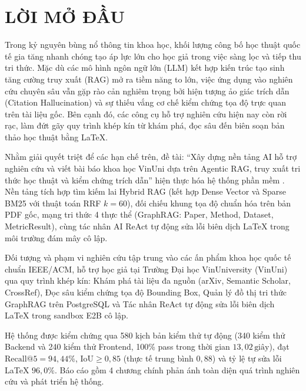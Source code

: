 \cleardoublepage
{}
\chapter*{LỜI MỞ ĐẦU}

Trong kỷ nguyên bùng nổ thông tin khoa học, khối lượng công bố học thuật quốc tế gia tăng nhanh chóng tạo áp lực lớn cho học giả trong việc sàng lọc và tiếp thu tri thức. Mặc dù các mô hình ngôn ngữ lớn (LLM) kết hợp kiến trúc tạo sinh tăng cường truy xuất (RAG) mở ra tiềm năng to lớn, việc ứng dụng vào nghiên cứu chuyên sâu vẫn gặp rào cản nghiêm trọng bởi hiện tượng ảo giác trích dẫn (Citation Hallucination) và sự thiếu vắng cơ chế kiểm chứng tọa độ trực quan trên tài liệu gốc. Bên cạnh đó, các công cụ hỗ trợ nghiên cứu hiện nay còn rời rạc, làm đứt gãy quy trình khép kín từ khám phá, đọc sâu đến biên soạn bản thảo học thuật bằng LaTeX.

Nhằm giải quyết triệt để các hạn chế trên, đề tài: ``Xây dựng nền tảng AI hỗ trợ nghiên cứu và viết bài báo khoa học VinUni dựa trên Agentic RAG, truy xuất tri thức học thuật và kiểm chứng trích dẫn'' hiện thực hóa hệ thống phần mềm \VS. Nền tảng tích hợp tìm kiếm lai Hybrid RAG (kết hợp Dense Vector và Sparse BM25 với thuật toán RRF $k=60$), đối chiếu khung tọa độ chuẩn hóa trên bản PDF gốc, mạng tri thức 4 thực thể (GraphRAG: Paper, Method, Dataset, MetricResult), cùng tác nhân AI ReAct tự động sửa lỗi biên dịch LaTeX trong môi trường đám mây cô lập.

Đối tượng và phạm vi nghiên cứu tập trung vào các ấn phẩm khoa học quốc tế chuẩn IEEE/ACM, hỗ trợ học giả tại Trường Đại học VinUniversity (VinUni) qua quy trình khép kín: Khám phá tài liệu đa nguồn (arXiv, Semantic Scholar, CrossRef), Đọc sâu kiểm chứng tọa độ Bounding Box, Quản lý đồ thị tri thức GraphRAG trên PostgreSQL và Tác nhân ReAct tự động sửa lỗi biên dịch LaTeX trong sandbox E2B cô lập.

Hệ thống được kiểm chứng qua 580 kịch bản kiểm thử tự động (340 kiểm thử Backend và 240 kiểm thử Frontend, 100\% pass trong thời gian $13{,}02\,\text{giây}$), đạt $\text{Recall@5} = 94{,}44\%$, $\text{IoU} \ge 0{,}85$ (thực tế trung bình $0{,}88$) và tỷ lệ tự sửa lỗi LaTeX $96{,}0\%$. Báo cáo gồm 4 chương chính phản ánh toàn diện quá trình nghiên cứu và phát triển hệ thống.

